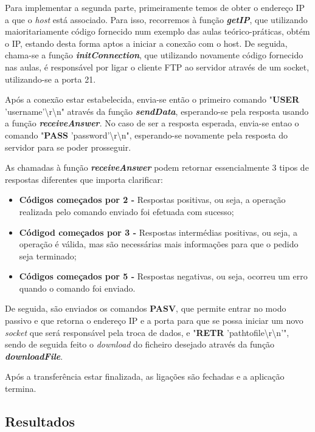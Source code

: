 \documentclass[11pt]{article}
\begin{document}
Para implementar a segunda parte, primeiramente temos de obter o endereço IP a que o \emph{host} está associado. Para isso, recorremos à função \textit{\textbf{getIP}}, que utilizando maioritariamente código fornecido num exemplo das aulas teórico-práticas, obtém o IP, estando desta forma aptos a iniciar a conexão com o host. De seguida, chama-se a função \textit{\textbf{initConnection}}, que utilizando novamente código fornecido nas aulas, é responsável por ligar o cliente FTP ao servidor através de um socket, utilizando-se a porta 21.

Após a conexão estar estabelecida, envia-se então o primeiro comando "\textbf{USER} 'username'\textbackslash r\textbackslash n" através da função \textit{\textbf{sendData}}, esperando-se pela resposta usando a função \textit{\textbf{receiveAnswer}}. No caso de ser a resposta esperada, envia-se entao o comando "\textbf{PASS} 'password'\textbackslash r\textbackslash n", esperando-se novamente pela resposta do servidor para se poder prosseguir.

As chamadas à função \textit{\textbf{receiveAnswer}} podem retornar essencialmente 3 tipos de respostas diferentes que importa clarificar:

\begin{itemize}
    \item \textbf{Códigos começados por 2 -} Respostas positivas, ou seja, a operação realizada pelo comando enviado foi efetuada com sucesso;
    \item \textbf{Códigod começados por 3 -} Respostas intermédias positivas, ou seja, a operação é válida, mas são necessárias mais informações para que o pedido seja terminado;
    \item \textbf{Códigos começados por 5 -} Respostas negativas, ou seja, ocorreu um erro quando o comando foi enviado.
\end{itemize}

De seguida, são enviados os comandos \textbf{PASV}, que permite entrar no modo passivo e que retorna o endereço IP e a porta para que se possa iniciar um novo \emph{socket} que será responsável pela troca de dados, e "\textbf{RETR} 'path\textunderscore to\textunderscore file\textbackslash r\textbackslash n'", sendo de seguida feito o \emph{download} do ficheiro desejado através da função \textit{\textbf{downloadFile}}. 

Após a transferência estar finalizada, as ligações são fechadas e a aplicação termina.

\subsection{Resultados}
\end{document}
